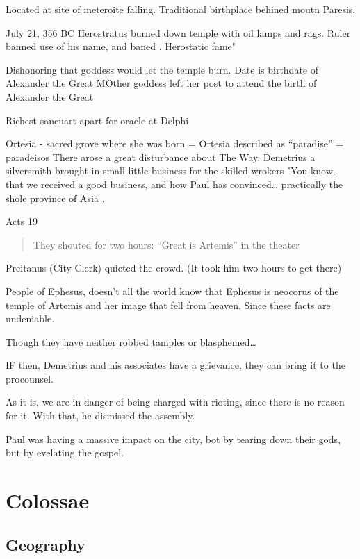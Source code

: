 \documentclass[
]{book}
\begin{document}
Located at site of meteroite falling. Traditional birthplace behined moutn Paresis.

July 21, 356 BC Herostratus burned down temple with oil lamps and rags. Ruler banned use of his name, and baned . Herostatic fame"

Dishonoring that goddess would let the temple burn. Date is birthdate of Alexander the Great MOther goddess left her post to attend the birth of Alexander the Great

Richest sancuart apart for oracle at Delphi

Ortesia - sacred grove where she was born = Ortesia described as ``paradise'' = paradeisos
There arose a great disturbance about The Way. Demetrius a silversmith brought in small little business for the skilled wrokers "You know, that we received a good business, and how Paul has convinced\ldots{} practically the shole province of Asia .

Acts 19

\begin{quote}
They shouted for two hours: ``Great is Artemis'' in the theater
\end{quote}

Preitanus (City Clerk) quieted the crowd. (It took him two hours to get there)

People of Ephesus, doesn't all the world know that Ephesus is neocorus of the temple of Artemis and her image that fell from heaven. Since these facts are undeniable.

Though they have neither robbed tamples or blasphemed\ldots{}

IF then, Demetrius and his associates have a grievance, they can bring it to the procounsel.

As it is, we are in danger of being charged with rioting, since there is no reason for it. With that, he dismissed the assembly.

Paul was having a massive impact on the city, bot by tearing down their gods, but by evelating the gospel.

\hypertarget{colossae}{%
\chapter{Colossae}\label{colossae}}

\hypertarget{geography-1}{%
\section{Geography}\label{geography-1}}
\end{document}
